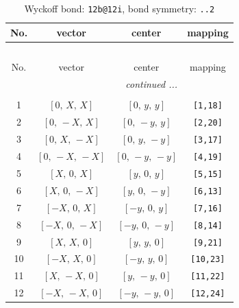 \documentclass[fleqn,8pt]{jsarticle}
\begin{document}
\renewcommand{\arraystretch}{1.2}
\begin{longtable}{cccc}
\caption{Wyckoff bond: {\tt 12b@12i}, bond symmetry: {\tt ..2}}
 \\
 \hline \hline
No. & vector & center & mapping \\ \hline \endfirsthead

\multicolumn{3}{l}{\tablename\ \thetable{}} \\
 \hline \hline
No. & vector & center & mapping \\ \hline \endhead

 \hline \hline
\multicolumn{3}{r}{\footnotesize\it continued ...} \\ \endfoot

 \hline \hline
\multicolumn{3}{r}{} \\ \endlastfoot

1 & $\left[ 0,\, X,\, X \right]$ & $\left[ 0,\, y,\, y \right]$ & {\tt [1,18]} \\ \hline
2 & $\left[ 0,\, - X,\, X \right]$ & $\left[ 0,\, - y,\, y \right]$ & {\tt [2,20]} \\ \hline
3 & $\left[ 0,\, X,\, - X \right]$ & $\left[ 0,\, y,\, - y \right]$ & {\tt [3,17]} \\ \hline
4 & $\left[ 0,\, - X,\, - X \right]$ & $\left[ 0,\, - y,\, - y \right]$ & {\tt [4,19]} \\ \hline
5 & $\left[ X,\, 0,\, X \right]$ & $\left[ y,\, 0,\, y \right]$ & {\tt [5,15]} \\ \hline
6 & $\left[ X,\, 0,\, - X \right]$ & $\left[ y,\, 0,\, - y \right]$ & {\tt [6,13]} \\ \hline
7 & $\left[ - X,\, 0,\, X \right]$ & $\left[ - y,\, 0,\, y \right]$ & {\tt [7,16]} \\ \hline
8 & $\left[ - X,\, 0,\, - X \right]$ & $\left[ - y,\, 0,\, - y \right]$ & {\tt [8,14]} \\ \hline
9 & $\left[ X,\, X,\, 0 \right]$ & $\left[ y,\, y,\, 0 \right]$ & {\tt [9,21]} \\ \hline
10 & $\left[ - X,\, X,\, 0 \right]$ & $\left[ - y,\, y,\, 0 \right]$ & {\tt [10,23]} \\ \hline
11 & $\left[ X,\, - X,\, 0 \right]$ & $\left[ y,\, - y,\, 0 \right]$ & {\tt [11,22]} \\ \hline
12 & $\left[ - X,\, - X,\, 0 \right]$ & $\left[ - y,\, - y,\, 0 \right]$ & {\tt [12,24]} \\
\end{longtable}
\renewcommand{\arraystretch}{1.2}
\end{document}
